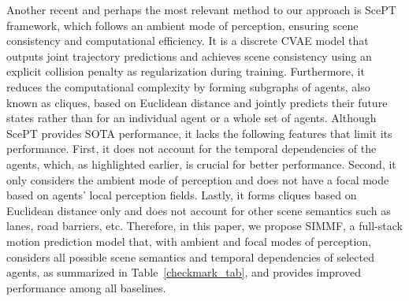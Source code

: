 \documentclass[letterpaper, 10 pt, conference]{ieeeconf}  %
\begin{document}
Another recent and perhaps the most relevant method to our approach is ScePT \cite{chen2022scept} framework, which follows an ambient mode of perception, ensuring scene consistency and computational efficiency. It is a discrete CVAE model that outputs joint trajectory predictions and achieves scene consistency using an explicit collision penalty as regularization during training. Furthermore, it reduces the computational complexity by forming subgraphs of agents, also known as cliques, based on Euclidean distance and jointly predicts their future states rather than for an individual agent or a whole set of agents. Although ScePT provides SOTA performance, it lacks the following features that limit its performance. First, it does not account for the temporal dependencies of the agents, which, as highlighted earlier, is crucial for better performance. Second, it only considers the ambient mode of perception and does not have a focal mode based on agents' local perception fields. Lastly, it forms cliques based on Euclidean distance only and does not account for other scene semantics such as lanes, road barriers, etc. Therefore, in this paper, we propose SIMMF, a full-stack motion prediction model that, with ambient and focal modes of perception, considers all possible scene semantics and temporal dependencies of selected agents, as summarized in Table~\ref{checkmark_tab}, and provides improved performance among all baselines.
\end{document}
